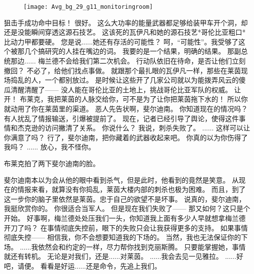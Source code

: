 \documentclass[openany]{book}
\begin{document}
\begin{figure}[h]
    \centering
    \texttt{[image: Avg\_bg\_29\_g11\_monitoringroom]}
\end{figure}
\begin{dialogue}
     狙击手成功命中目标！
     很好。
     这么大功率的能量武器都足够给装甲车开个洞，却还是没能瞬间穿透这源石技艺。
     这该死的瓦伊凡和她的源石技艺*哥伦比亚粗口*比动力甲都要硬。
     您是说......她还有存活的可能性？
     呵，“可能性”。我受够了这个被那几个搞研究的人挂在嘴边的词。
     我要的是一个结果，明确的结果。
     那副总统那边......
     梅兰德不会给我们第二次机会。
     行动队依旧在待命，是否让他们立刻撤回？
     不必了，给他们找点事做。
     就跟那个最扎眼的瓦伊凡一样，那些在莱茵现场捣乱的人，一个都别放过。
     是时候让这些开了几家公司就以为能拨弄风云的傻瓜清醒清醒了——
     没人能在哥伦比亚的土地上，挑战哥伦比亚军队的权威。
     让开！
     布莱克，我把莱茵的人脉交给你，可不是为了让你把莱茵拖下水的！
     所以你就动用了你在莱茵里的渠道。
     恶人先告状啊，斐尔迪南。
     你知道现在的情况吗？
     有人扰乱了情报输送，引爆被提前了。
     现在，记者已经引导了舆论，使得这件事情和杰克逊的访问撇清了关系。
     你说什么？
     我说，刺杀失败了。
     ......
     这样可以让你满意了吗？
     行了，斐尔迪南，把你藏着的武器收起来吧。
     你真的以为你伤得了我吗？
     ......
     放心，我不怪你。\par
    布莱克拍了两下斐尔迪南的脸。\par
    斐尔迪南本以为会从他的眼中看到杀气，但是此时，他看到的竟然是笑意。
     从现在的情报来看，就算没有你捣乱，莱茵大楼内部的刺杀也极为困难。
     而且，到了这一步你的脑子里依然是莱茵。忠于自己的欲望不是坏事。
     说真的，斐尔迪南，我挺欣赏你的。
     你很适合当军人。
     但是现在我们失败了——
     那又如何？这只是个开始。
     好事啊，梅兰德处处压我们一头，你知道我上面有多少人早就想拿梅兰德开刀了吗？
     在事情彻底失控前，眼下的失败只会让我获得更多的支持。
     如果事情彻底失控——
     相信我，你不会想要知道我的下场的。
     当然，我也无法保证你的下场。
     ......我依然会和约定的一样，尽力帮你找到克丽斯腾。
     只要能掌握她，事情就还有转机。
     无论是对我们，还是......对莱茵。
     ......我会去见一见雅拉。
     ......好吧，请便。
     看看是好运......还是命令，先追上我们。
\end{dialogue}
\end{document}
